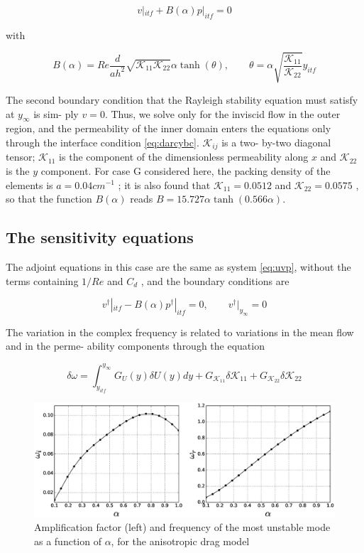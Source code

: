 \begin{equation}
v|_{itf} + B(\alpha) p|_{itf} = 0
\label{eq:darcybc}
\end{equation}

with

$$
B(\alpha) = Re \dfrac{d}{ah^2} \sqrt{\mathcal{K}_{11}\mathcal{K}_{22}} \alpha \tanh (\theta), \qquad \theta = \alpha \sqrt{\dfrac{\mathcal{K}_{11}}{\mathcal{K}_{22}}}  y_{itf}
$$

The second boundary condition that the Rayleigh stability equation must satisfy at $y_{\infty}$ is sim-
ply $v = 0$. Thus, we solve only for the inviscid flow in the outer region, and the permeability
of the inner domain enters the equations only through the interface condition \ref{eq:darcybc}. $\mathcal{K}_{ij}$ is a two-
by-two diagonal tensor; $\mathcal{K}_{11}$ is the component of the dimensionless permeability along $x$ and
$\mathcal{K}_{22}$ is the $y$ component. For case G considered here, the packing density of the elements is
$a = 0.04 cm^{-1}$ ; it is also found that $\mathcal{K}_{11}= 0.0512$ and $\mathcal{K}_{22} = 0.0575$ \cite{zampognaprivate},  so that the function $B(\alpha)$
reads $B = 15.727 \alpha \tanh (0.566 \alpha)$.


\subsection{The sensitivity equations}

The adjoint equations in this case are the same as system \ref{eq:uvp}, without the terms containing $1/Re$
and $C_d$ , and the boundary conditions are

\begin{equation}
v^{\dagger}|_{itf} - B(\alpha) p^{\dagger}|_{itf} = 0, \qquad v^{\dagger}|_{y_{\infty}} = 0
\label{eq:darcybc_adjoint}
\end{equation}

The variation in the complex frequency is related to variations in the mean flow and in the perme-
ability components through the equation

$$
\delta \omega = \int_{y_{itf}}^{y_{\infty}}  G_U(y) \delta U(y) dy + G_{\mathcal{K}_{11}} \delta \mathcal{K}_{11} + G_{\mathcal{K}_{22}} \delta \mathcal{K}_{22}
$$

\begin{figure}[H]
	\centering
	\includegraphics[width=1\linewidth]{chapter_3/figure/6}
	\caption{Amplification factor (left) and frequency of the most unstable mode as a function of $\alpha$, for the anisotropic drag
		model}
	\label{fig:6}
\end{figure}


